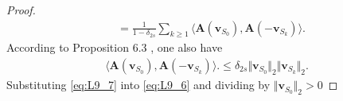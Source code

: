 \begin{proof}
\begin{align}
    &= \frac{1}{1 - \delta_{2s}} \sum_{k \geq 1} \langle \textbf{A}(\textbf{v}_{S_0}), \textbf{A}(-\textbf{v}_{S_k}) \rangle.
\end{align}
According to Proposition 6.3 \cite[p. 135]{FR}, one also have
\begin{align}\label{eq:L9_7}
\langle \textbf{A}(\textbf{v}_{S_0}), \textbf{A}(-\textbf{v}_{S_k}) \rangle. \leq \delta_{2s} \Vert \textbf{v}_{S_0} \Vert_2 \Vert \textbf{v}_{S_k} \Vert_2.
\end{align}
Substituting \eqref{eq:L9_7} into \eqref{eq:L9_6} and dividing by $\Vert \mathbf{v}_{S_0} \Vert_2 > 0$
\end{proof}


